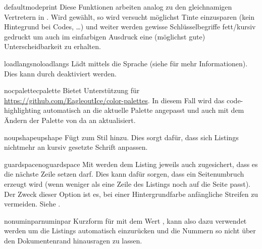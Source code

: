 \documentclass{sopra-base}
\begin{document}
    \begin{argument}{defaultmode}{print}
        Diese Funktionen arbeiten analog zu den gleichnamigen Vertretern in . Wird  gewählt, so wird versucht möglichst Tinte einzusparen (kein Hintegrund bei Codes, \ldots) und weiter werden gewisse
        Schlüsselbegriffe fett/kursiv gedruckt um auch im einfarbigen Ausdruck eine
        (möglichst gute) Unterscheidbarkeit zu erhalten.
    \end{argument}

    \begin{argument}{loadlangs}{noloadlangs}
        Lädt mittels  die Sprache  (siehe  für mehr Informationen). Dies kann durch  deaktiviert werden. 
    \end{argument}

    \begin{argument}{nocpalette}{cpalette}
        Bietet Unterstützung für \href{color-palettes}{https://github.com/EagleoutIce/color-palettes}. In diesem Fall wird das code-highlighting automatisch an die aktuelle Palette angepasst und auch mit dem Ändern der Palette von da an aktualisiert.
    \end{argument}

    \begin{argument}{noupshape}{upshape}
        Fügt  zum Stil hinzu. Dies sorgt dafür, dass sich Listings nichtmehr an kursiv gesetzte Schrift anpassen.
    \end{argument}

    \begin{argument}{guardspace}{noguardspace}
        Mit  werden dem Listing jeweils auch zugesichert, dass es die nächste Zeile setzen darf. Dies kann dafür sorgen, dass ein Seitenumbruch erzeugt wird (wenn weniger als eine Zeile des Listings noch auf die Seite passt). Der Zweck dieser Option ist es, bei einer Hintergrundfarbe anfängliche Streifen zu vermeiden. Siehe .
    \end{argument}

    \begin{argument}{nonuminpar}{numinpar}
        Kurzform für  mit dem Wert \glqq{}{\makeatletter\@@sol@numinpar@length}\grqq{}, kann also dazu verwendet
        werden um die Listings automatisch einzurücken und die Nummern so nicht über den Dokumentenrand hinausragen zu lassen.
    \end{argument}
\end{document}
